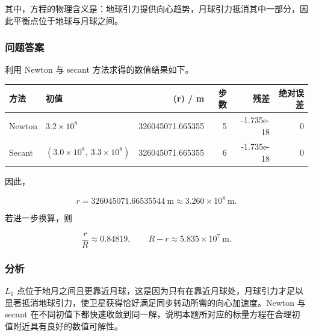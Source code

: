 \documentclass[12pt,a4paper,fontset=none]{ctexart}
\newcommand{\blocktitle}[1]{\subsubsection{#1}}
\newcounter{none}
\newif\ifwidetable
\begin{document}
其中，方程的物理含义是：地球引力提供向心趋势，月球引力抵消其中一部分，因此平衡点位于地球与月球之间。

\blocktitle{问题答案}

利用 Newton 与 secant 方法求得的数值结果如下。

{\def\LTcaptype{none} %
\widetabletrue
\begin{longtable}[]{@{}llrrrr@{}}
\toprule\noalign{}
方法 & 初值 & (r) / m & 步数 & 残差 & 绝对误差 \\
\midrule\noalign{}
\endhead
\bottomrule\noalign{}
\endlastfoot
Newton & \(3.2\times 10^8\) & 326045071.665355 & 5 & -1.735e-18 & 0 \\
Secant & \((3.0\times 10^8,\ 3.3\times 10^8)\) & 326045071.665355 & 6 & -1.735e-18 & 0 \\
\end{longtable}
}

因此，

\[
r=326045071.66535544\ \mathrm{m}
\approx 3.260\times 10^8\ \mathrm{m}.
\]

若进一步换算，则

\[
\frac{r}{R}\approx 0.84819,\qquad
R-r\approx 5.835\times 10^7\ \mathrm{m}.
\]

\blocktitle{分析}

\(L_1\) 点位于地月之间且更靠近月球，这是因为只有在靠近月球处，月球引力才足以显著抵消地球引力，使卫星获得恰好满足同步转动所需的向心加速度。Newton 与 secant 在不同初值下都快速收敛到同一解，说明本题所对应的标量方程在合理初值附近具有良好的数值可解性。
\end{document}
